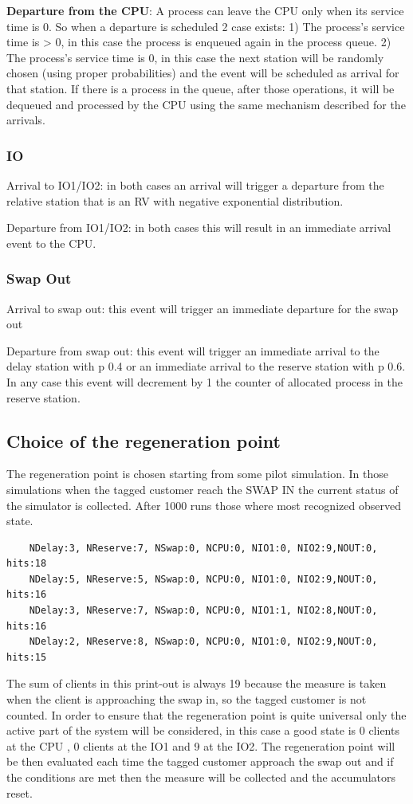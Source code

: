 \documentclass[12pt,a4paper]{article}
\begin{document}
\textbf{Departure from the CPU}: A process can leave the CPU only when its service time is 0. So when a departure is scheduled 2 case exists: 1) The process's service time is > 0, in this case the process is enqueued again in the process queue. 2) The process's service time is 0, in this case the next station will be randomly chosen (using proper probabilities) and the event will be scheduled as arrival for that station. If there is a process in the queue, after those operations, it will be dequeued and processed by the CPU using the same mechanism described for the arrivals.

\subsubsection{IO}

Arrival to IO1/IO2: in both cases an arrival will trigger a departure from the relative station that is an RV with negative exponential distribution.

Departure from IO1/IO2: in both cases this will result in an immediate arrival event to the CPU.

\subsubsection{Swap Out}
Arrival to swap out: this event will trigger an immediate departure for the swap out

Departure from swap out: this event will trigger an immediate arrival to the delay station with p 0.4 or an immediate arrival to the reserve station with p 0.6. In any case this event will decrement by 1 the counter of allocated process in the reserve station.


\subsection{Choice of the regeneration point}
The regeneration point is chosen starting from some pilot simulation. In those simulations when the tagged customer reach the SWAP IN the current status of the simulator is collected. After 1000 runs those where most recognized observed state.
\begin{verbatim}
    NDelay:3, NReserve:7, NSwap:0, NCPU:0, NIO1:0, NIO2:9,NOUT:0, hits:18
    NDelay:5, NReserve:5, NSwap:0, NCPU:0, NIO1:0, NIO2:9,NOUT:0, hits:16
    NDelay:3, NReserve:7, NSwap:0, NCPU:0, NIO1:1, NIO2:8,NOUT:0, hits:16
    NDelay:2, NReserve:8, NSwap:0, NCPU:0, NIO1:0, NIO2:9,NOUT:0, hits:15
\end{verbatim}
The sum of clients in this print-out is always 19 because the measure is taken when the client is approaching the swap in, so the tagged customer is not counted. In order to ensure that the regeneration point is quite universal only the active part of the system will be considered, in this case a good state is 0 clients at the CPU , 0 clients at the IO1 and 9 at the IO2. The regeneration point will be then evaluated each time the tagged customer approach the swap out and if the conditions are met then the measure will be collected and the accumulators reset.
\end{document}
